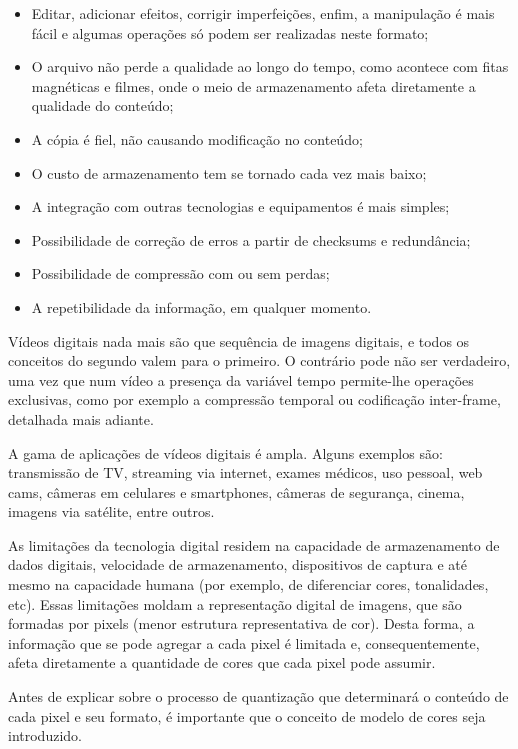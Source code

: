 \begin{itemize}
	\item Editar, adicionar efeitos, corrigir imperfeições, enfim, a manipulação é mais fácil e algumas operações só podem ser realizadas neste formato;
	\item O arquivo não perde a qualidade ao longo do tempo, como acontece com fitas magnéticas e filmes, onde o meio de armazenamento afeta diretamente a qualidade do conteúdo;
	\item A cópia é fiel, não causando modificação no conteúdo;
	\item O custo de armazenamento tem se tornado cada vez mais baixo;
	\item A integração com outras tecnologias e equipamentos é mais simples;
	\item Possibilidade de correção de erros a partir de checksums e redundância;
	\item Possibilidade de compressão com ou sem perdas;
	\item A repetibilidade da informação, em qualquer momento.
\end{itemize}

Vídeos digitais nada mais são que sequência de imagens digitais, e todos os conceitos do segundo valem para o primeiro. O contrário pode não ser verdadeiro, uma vez que num vídeo a presença da variável tempo permite-lhe operações exclusivas, como por exemplo a compressão temporal ou codificação inter-frame, detalhada mais adiante.

A gama de aplicações de vídeos digitais é ampla. Alguns exemplos são: transmissão de TV, streaming via internet, exames médicos, uso pessoal, web cams, câmeras em celulares e smartphones, câmeras de segurança, cinema, imagens via satélite, entre outros.

As limitações da tecnologia digital residem na capacidade de armazenamento de dados digitais, velocidade de armazenamento, dispositivos de captura e até mesmo na capacidade humana (por exemplo, de diferenciar cores, tonalidades, etc). Essas limitações moldam a representação digital de imagens, que são formadas por pixels (menor estrutura representativa de cor). Desta forma, a informação que se pode agregar a cada pixel é limitada e, consequentemente, afeta diretamente a quantidade de cores que cada pixel pode assumir.

Antes de explicar sobre o processo de quantização que determinará o conteúdo de cada pixel e seu formato, é importante que o conceito de modelo de cores seja introduzido.

